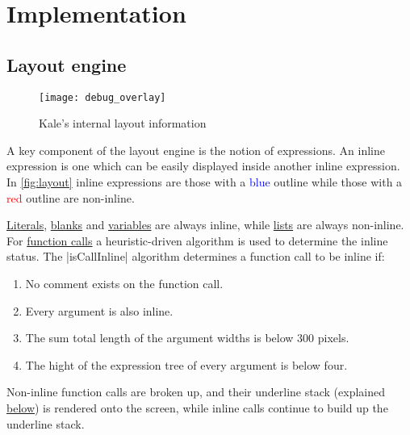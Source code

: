 \chapter{Implementation}

\section{Layout engine}

\begin{wrapfigure}[11]{r}{0.5\columnwidth}
\texttt{[image: debug\_overlay]}
\caption{Kale's internal layout information\protect\footnotemark}
\label{fig:layout}
\end{wrapfigure}
\medskip

A key component of the layout engine is the notion of  expressions.
An inline expression is one which can be easily displayed inside another inline
expression. In \autoref{fig:layout} inline expressions are those with a
\textcolor{blue}{blue} outline while those with a \textcolor{red}{red} outline
are non-inline.

\hyperref[expr:literal]{Literals}, \hyperref[expr:blank]{blanks} and
\hyperref[expr:variable]{variables} are always inline, while
\hyperref[expr:list]{lists} are always non-inline.
For \hyperref[expr:function]{function calls} a heuristic-driven algorithm is
used to determine the inline status. The |isCallInline| algorithm determines
a function call to be inline if:

\begin{enumerate}[noitemsep]
	\item No comment exists on the function call.
	\item Every argument is also inline.
	\item The sum total length of the argument widths is below 300 pixels.
	\item The hight of the expression tree of every argument is below four.
\end{enumerate}

Non-inline function calls are broken up, and their underline stack (explained
\hyperref[layout:underlines]{below}) is rendered onto the screen, while inline
calls continue to build up the underline stack.

